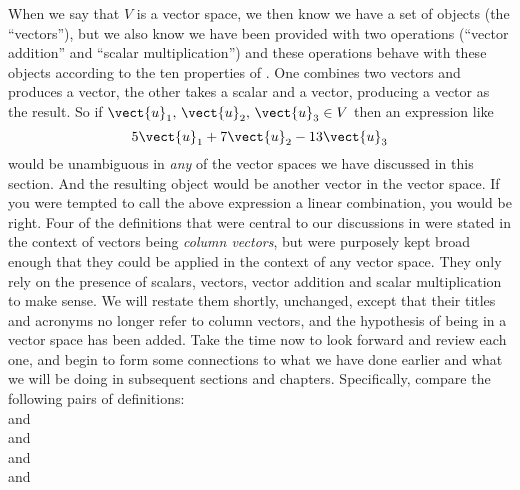 %
%
When we say that $V$ is a vector space, we then know we have a set of objects (the ``vectors''), but we also know we have been provided with two operations (``vector addition'' and ``scalar multiplication'') and these operations behave with these objects according to the ten properties of .  One combines two vectors and produces a vector, the other takes a scalar and a vector, producing a vector as the result.  So if $\vect{u}_1,\,\vect{u}_2,\,\vect{u}_3\in V$ then an expression like
%
\begin{equation*}
5\vect{u}_1+7\vect{u}_2-13\vect{u}_3
\end{equation*}
%
would be unambiguous in {\em any} of the vector spaces we have discussed in this section.  And the resulting object would be another vector in the vector space.  If you were tempted to call the above expression a linear combination, you would be right.  Four of the definitions that were central to our discussions in  were stated in the context of vectors being {\em column vectors}, but were purposely kept broad enough that they could be applied in the context of any vector space.  They only rely on the presence of scalars, vectors, vector addition and scalar multiplication to make sense.  We will restate them shortly, unchanged, except that their titles and acronyms no longer refer to column vectors, and the hypothesis of being in a vector space has been added.  Take the time now to look forward and review each one, and begin to form some connections to what we have done earlier and what we will be doing in subsequent sections and chapters.  Specifically, compare the following pairs of definitions:\\[6pt]
 and \\
 and \\
 and \\
 and 
%
%
%

